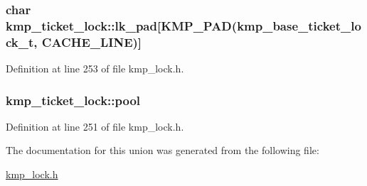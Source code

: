\hypertarget{unionkmp__ticket__lock_a0d8018b3fe9bdf60216f3d3dc870cc5d}{
\subsubsection[{lk\-\_\-pad}]{\setlength{\rightskip}{0pt plus 5cm}char kmp\-\_\-ticket\-\_\-lock\-::lk\-\_\-pad\mbox{[}{\bf K\-M\-P\-\_\-\-P\-A\-D}({\bf kmp\-\_\-base\-\_\-ticket\-\_\-lock\-\_\-t}, {\bf C\-A\-C\-H\-E\-\_\-\-L\-I\-N\-E})\mbox{]}}}\label{unionkmp__ticket__lock_a0d8018b3fe9bdf60216f3d3dc870cc5d}


Definition at line 253 of file kmp\-\_\-lock.\-h.

\hypertarget{unionkmp__ticket__lock_a54288856f4b927cd2da1c0aa5c702127}{
\subsubsection[{pool}]{ kmp\-\_\-ticket\-\_\-lock\-::pool}}\label{unionkmp__ticket__lock_a54288856f4b927cd2da1c0aa5c702127}


Definition at line 251 of file kmp\-\_\-lock.\-h.



The documentation for this union was generated from the following file\-:\begin{DoxyCompactItemize}
\item 
\hyperlink{kmp__lock_8h}{kmp\-\_\-lock.\-h}\end{DoxyCompactItemize}
